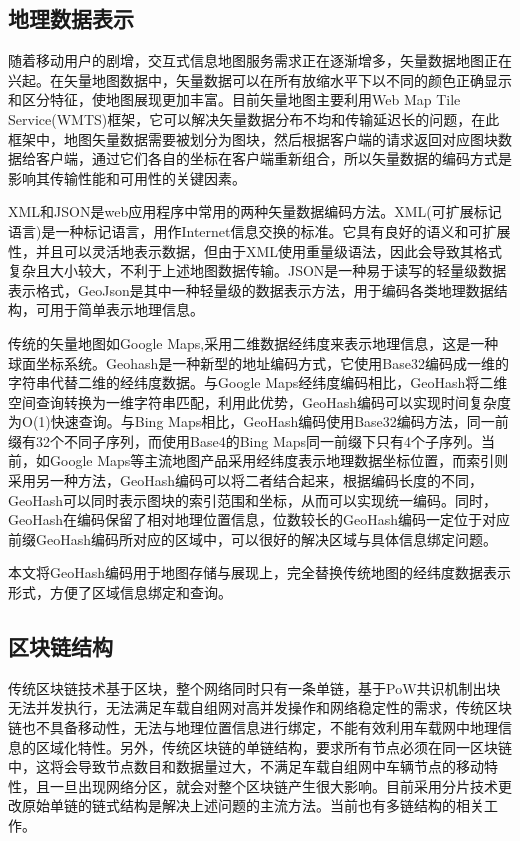 \subsection{地理数据表示}
随着移动用户的剧增，交互式信息地图服务需求正在逐渐增多，矢量数据地图正在兴起。在矢量地图数据中，矢量数据可以在所有放缩水平下以不同的颜色正确显示和区分特征，使地图展现更加丰富\cite{zhou2016virtual}。目前矢量地图主要利用Web Map Tile Service(WMTS)框架\cite{garcia2013ols}，它可以解决矢量数据分布不均和传输延迟长的问题，在此框架中，地图矢量数据需要被划分为图块，然后根据客户端的请求返回对应图块数据给客户端，通过它们各自的坐标在客户端重新组合，所以矢量数据的编码方式是影响其传输性能和可用性的关键因素。

XML和JSON是web应用程序中常用的两种矢量数据编码方法\cite{wang2011improving}。XML(可扩展标记语言)是一种标记语言，用作Internet信息交换的标准\cite{braysperberg}。它具有良好的语义和可扩展性，并且可以灵活地表示数据，但由于XML使用重量级语法，因此会导致其格式复杂且大小较大，不利于上述地图数据传输。JSON是一种易于读写的轻量级数据表示格式，GeoJson是其中一种轻量级的数据表示方法，用于编码各类地理数据结构，可用于简单表示地理信息\cite{li2015performance}。

传统的矢量地图如Google Maps\cite{kahle2013ggmap},采用二维数据经纬度来表示地理信息，这是一种球面坐标系统。Geohash是一种新型的地址编码方式，它使用Base32编码成一维的字符串代替二维的经纬度数据。与Google Maps经纬度编码相比，GeoHash将二维空间查询转换为一维字符串匹配，利用此优势，GeoHash编码可以实现时间复杂度为O(1)快速查询\cite{liu2014geohash}。与Bing Maps\cite{teslya2014web}相比，GeoHash编码使用Base32编码方法，同一前缀有32个不同子序列，而使用Base4的Bing Maps同一前缀下只有4个子序列。当前，如Google Maps等主流地图产品采用经纬度表示地理数据坐标位置，而索引则采用另一种方法，GeoHash编码可以将二者结合起来，根据编码长度的不同，GeoHash可以同时表示图块的索引范围和坐标，从而可以实现统一编码。同时，GeoHash在编码保留了相对地理位置信息，位数较长的GeoHash编码一定位于对应前缀GeoHash编码所对应的区域中，可以很好的解决区域与具体信息绑定问题。

本文将GeoHash编码用于地图存储与展现上，完全替换传统地图的经纬度数据表示形式，方便了区域信息绑定和查询。

\subsection{区块链结构}
传统区块链技术基于区块，整个网络同时只有一条单链，基于PoW共识机制出块无法并发执行，无法满足车载自组网对高并发操作和网络稳定性的需求，传统区块链也不具备移动性，无法与地理位置信息进行绑定，不能有效利用车载网中地理信息的区域化特性。另外，传统区块链的单链结构，要求所有节点必须在同一区块链中，这将会导致节点数目和数据量过大，不满足车载自组网中车辆节点的移动特性，且一旦出现网络分区，就会对整个区块链产生很大影响。目前采用分片技术更改原始单链的链式结构是解决上述问题的主流方法\cite{global2020}。当前也有多链结构的相关工作。

